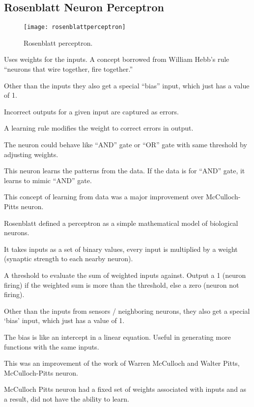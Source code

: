 	\subsection{Rosenblatt Neuron Perceptron}
 	\begin{figure}[h]
		\centering
		\texttt{[image: rosenblattperceptron]}
		\caption[Rosenblatt perceptron]{Rosenblatt perceptron.}
		\label{fig:rosenblattperceptron}
	\end{figure}
	\begin{bulletedlist}
		\item Uses weights for the inputs.  A concept borrowed from William Hebb's rule ``neurons that wire together, fire together.''
		\item Other than the inputs they also get a special ``bias'' input, which just has a value of 1.
		\item Incorrect outputs for a given input are captured as errors.
		\item A learning rule modifies the weight to correct errors in output.
		\item The neuron could behave like ``AND'' gate or ``OR'' gate with same threshold by adjusting weights.
		\item This neuron learns the patterns from the data. If the data is for ``AND'' gate, it learns to mimic ``AND'' gate.
		\item This concept of learning from data was a major improvement over McCulloch-Pitts neuron.
		\item Rosenblatt defined a perceptron as a simple mathematical model of biological neurons.
		\item It takes inputs as a set of binary values, every input is multiplied by a weight (synaptic strength to each nearby neuron).
		\item A threshold to evaluate the sum of weighted inputs against. Output a 1 (neuron firing) if the weighted sum is more than the threshold, else a zero (neuron not firing).
		\item Other than the inputs from sensors / neighboring neurons, they also get a special `bias' input, which just has a value of 1.
		\item The bias is like an intercept in a linear equation.  Useful in generating more functions with the same inputs.
		\item This was an improvement of the work of Warren McCulloch and Walter Pitts, McCulloch-Pitts neuron.
		\item McCulloch Pitts neuron had a fixed set of weights associated with inputs and as a result, did not have the ability to learn.

\end{bulletedlist}
